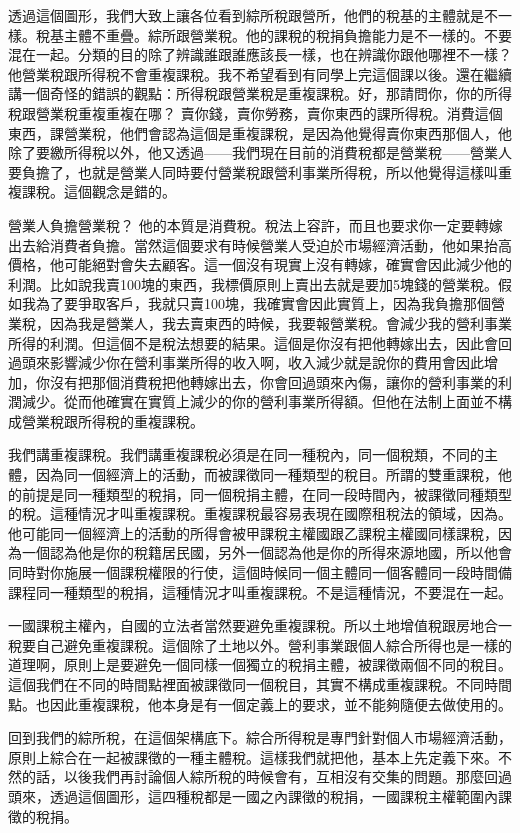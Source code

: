 \documentclass[]{ctexbook}
\begin{document}
透過這個圖形，我們大致上讓各位看到綜所稅跟營所，他們的稅基的主體就是不一樣。稅基主體不重疊。綜所跟營業稅。他的課稅的稅捐負擔能力是不一樣的。不要混在一起。分類的目的除了辨識誰跟誰應該長一樣，也在辨識你跟他哪裡不一樣？ 他營業稅跟所得稅不會重複課稅。我不希望看到有同學上完這個課以後。還在繼續講一個奇怪的錯誤的觀點：所得稅跟營業稅是重複課稅。好，那請問你，你的所得稅跟營業稅重複重複在哪？ 賣你錢，賣你勞務，賣你東西的課所得稅。消費這個東西，課營業稅，他們會認為這個是重複課稅，是因為他覺得賣你東西那個人，他除了要繳所得稅以外，他又透過------我們現在目前的消費稅都是營業稅------營業人要負擔了，也就是營業人同時要付營業稅跟營利事業所得稅，所以他覺得這樣叫重複課稅。這個觀念是錯的。

營業人負擔營業稅？ 他的本質是消費稅。稅法上容許，而且也要求你一定要轉嫁出去給消費者負擔。當然這個要求有時候營業人受迫於市場經濟活動，他如果抬高價格，他可能絕對會失去顧客。這一個沒有現實上沒有轉嫁，確實會因此減少他的利潤。比如說我賣100塊的東西，我標價原則上賣出去就是要加5塊錢的營業稅。假如我為了要爭取客戶，我就只賣100塊，我確實會因此實質上，因為我負擔那個營業稅，因為我是營業人，我去賣東西的時候，我要報營業稅。會減少我的營利事業所得的利潤。但這個不是稅法想要的結果。這個是你沒有把他轉嫁出去，因此會回過頭來影響減少你在營利事業所得的收入啊，收入減少就是說你的費用會因此增加，你沒有把那個消費稅把他轉嫁出去，你會回過頭來內傷，讓你的營利事業的利潤減少。從而他確實在實質上減少的你的營利事業所得額。但他在法制上面並不構成營業稅跟所得稅的重複課稅。

我們講重複課稅。我們講重複課稅必須是在同一種稅內，同一個稅類，不同的主體，因為同一個經濟上的活動，而被課徵同一種類型的稅目。所謂的雙重課稅，他的前提是同一種類型的稅捐，同一個稅捐主體，在同一段時間內，被課徵同種類型的稅。這種情況才叫重複課稅。重複課稅最容易表現在國際租稅法的領域，因為。他可能同一個經濟上的活動的所得會被甲課稅主權國跟乙課稅主權國同樣課稅，因為一個認為他是你的稅籍居民國，另外一個認為他是你的所得來源地國，所以他會同時對你施展一個課稅權限的行使，這個時候同一個主體同一個客體同一段時間備課程同一種類型的稅捐，這種情況才叫重複課稅。不是這種情況，不要混在一起。

一國課稅主權內，自國的立法者當然要避免重複課稅。所以土地增值稅跟房地合一稅要自己避免重複課稅。這個除了土地以外。營利事業跟個人綜合所得也是一樣的道理啊，原則上是要避免一個同樣一個獨立的稅捐主體，被課徵兩個不同的稅目。這個我們在不同的時間點裡面被課徵同一個稅目，其實不構成重複課稅。不同時間點。也因此重複課稅，他本身是有一個定義上的要求，並不能夠隨便去做使用的。

回到我們的綜所稅，在這個架構底下。綜合所得稅是專門針對個人市場經濟活動，原則上綜合在一起被課徵的一種主體稅。這樣我們就把他，基本上先定義下來。不然的話，以後我們再討論個人綜所稅的時候會有，互相沒有交集的問題。那麼回過頭來，透過這個圖形，這四種稅都是一國之內課徵的稅捐，一國課稅主權範圍內課徵的稅捐。
\end{document}
